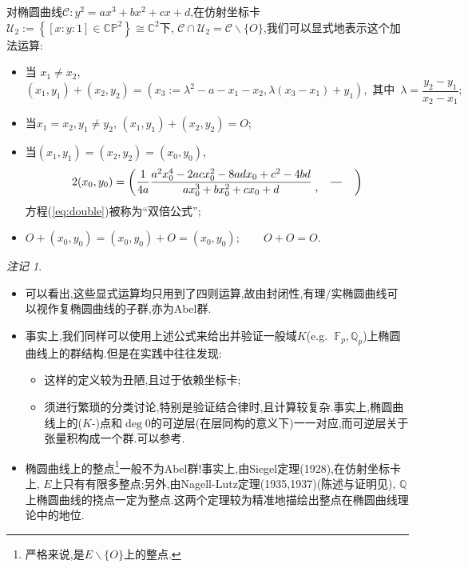 \documentclass[12pt,A4paper,oneside,reqno]{amsart}
\numberwithin{equation}{section}
\theoremstyle{definition}
\theoremstyle{plain}
\theoremstyle{plain}
\numberwithin{equation}{section}
\theoremstyle{remark}
\newtheorem{remarks}[theorem]{注记}
\begin{document}
对椭圆曲线$\mathcal{C}:y^2=ax^3+bx^2+cx+d$,在仿射坐标卡$\mathcal{U}_2:=\left\{[x:y:1] \in \mathbb{CP}^2\right\} \cong \mathbb{C}^2$下, $\mathcal{C} \cap \mathcal{U}_2=\mathcal{C} \smallsetminus \{O\}$,我们可以显式地表示这个加法运算:
\begin{itemize}
	\item 当 $x_1 \neq x_2$, $$(x_1,y_1)+(x_2,y_2)=\left(x_3:=\lambda^2-a-x_1-x_2, \lambda (x_3-x_1)+y_1 \right), \text{ 其中 } \,\lambda=\frac{y_2-y_1}{x_2-x_1};$$
	\item  当$x_1 = x_2, y_1 \neq y_2$, $(x_1,y_1)+(x_2,y_2)=O$;
	\item 当$(x_1,y_1)=(x_2,y_2)=(x_0,y_0)$,
	\begin{equation}\label{eq:double}
		2(x_0,y_0)=\left(\frac{1}{4a}\frac{a^2x_0^4-2acx_0^2-8adx_0+c^2-4bd}{ax_0^3+bx_0^2+cx_0+d} \;\raisebox{-5pt}{,}\quad\frac{\phantom{66}}{\phantom{66}}\quad\right)
	\end{equation}
	方程(\ref{eq:double})被称为“双倍公式”;
	\item $O+(x_0,y_0)=(x_0,y_0)+O=(x_0,y_0); \qquad O+O=O$.
\end{itemize}
\begin{remarks}\
	\begin{itemize}
		\item 可以看出,这些显式运算均只用到了四则运算,故由封闭性,有理/实椭圆曲线可以视作复椭圆曲线的子群,亦为Abel群.
		\item 事实上,我们同样可以使用上述公式来给出并验证一般域$K$(e.g. $\;\mathbb{F}_p,\mathbb{Q}_p$)上椭圆曲线上的群结构.但是在实践中往往发现:
		\begin{itemize}
			\item 这样的定义较为丑陋,且过于依赖坐标卡;
			\item 须进行繁琐的分类讨论,特别是验证结合律时,且计算较复杂.事实上,椭圆曲线上的($K$-)点和$\deg 0$的可逆层(在层同构的意义下)一一对应,而可逆层关于张量积构成一个群.可以参考\cite[Proposition 19.9.3]{vakil2017rising}.
		\end{itemize}
		\item 椭圆曲线上的整点\footnote{严格来说,是$E\smallsetminus \{O\}$上的整点.}一般不为Abel群!事实上,由Siegel定理(1928),在仿射坐标卡上, $E$上只有有限多整点;另外,由Nagell-Lutz定理(1935,1937)(陈述与证明见\cite[p56, Theorem 2.5]{silverman1992rational}), $\mathbb{Q}$上椭圆曲线的挠点一定为整点.这两个定理较为精准地描绘出整点在椭圆曲线理论中的地位.
	\end{itemize}
\end{remarks}
\end{document}
